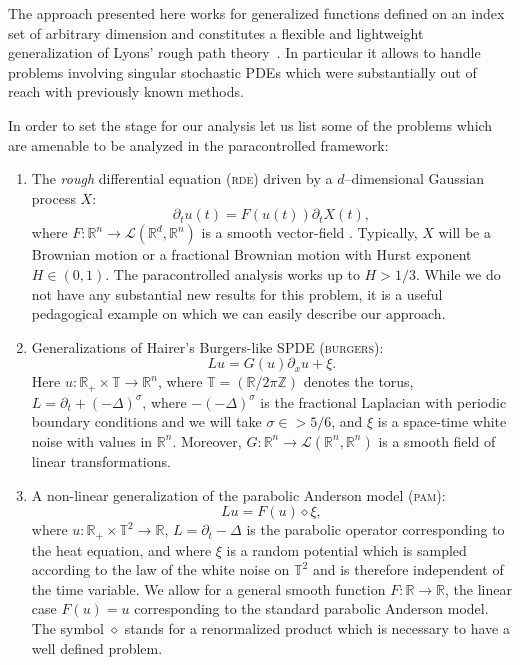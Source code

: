 \documentclass[11pt,a4paper]{article}
\theoremstyle{remark}
\newcommand{\R}{\mathbb{R}}
\newcommand{\Z}{\mathbb{Z}}
\newcommand{\Lcal}{\mathcal{L}}
\begin{document}
The approach presented here works for generalized functions defined on an index set of arbitrary dimension and constitutes a flexible and lightweight generalization of Lyons' rough path theory~\cite{Lyons1998}. In particular it allows to handle problems involving singular stochastic PDEs which were substantially out of reach with previously known methods.

In order to set the stage for our analysis let us list some of the problems which are amenable to be analyzed in the paracontrolled framework:
\begin{enumerate}%
  \item The \emph{rough} differential equation (\textsc{rde}) driven by a $d$--dimensional Gaussian process $X$: 
  \[
     \partial_t u(t) = F(u(t)) \partial_t X(t),%
  \]
  where $F\colon\R^n \rightarrow \Lcal(\R^d, \R^n)$ is a smooth vector-field . Typically, $X$ will be a Brownian motion or a fractional Brownian motion with Hurst exponent $H\in(0,1)$. The paracontrolled analysis works up to $H>1/3$.  While we do not have any substantial new results for this problem, it is a useful pedagogical example on which we can easily describe our approach.
  
  \item Generalizations of Hairer's Burgers-like SPDE (\textsc{burgers}):
  \[
     L u = G(u) \partial_x u + \xi.
  \]
  Here $u\colon \R_+ \times \mathbb{T} \rightarrow \R^n$, where $\mathbb{T} = (\R/2\pi \Z)$ denotes the torus, $L = \partial_t + (-\Delta)^{\sigma}$, where $-(-\Delta)^\sigma$ is the fractional Laplacian with periodic boundary conditions and we will take $\sigma \in > 5/6$, and $\xi$ is a space-time white noise with values in $\R^n$. Moreover, $G\colon \R^n \rightarrow \Lcal (\R^n, \R^n)$ is a smooth field of linear transformations.
  
  \item A non-linear generalization of the parabolic Anderson model (\textsc{pam}):
  \[
     L u = F(u) \diamond \xi,
  \]
  where $u \colon \R_+ \times \mathbb{T}^2 \rightarrow \R$, $L = \partial_t - \Delta$ is the parabolic operator corresponding to the heat equation, and where $\xi$ is a random potential which is sampled according to the law of the white noise on  $\mathbb{T}^2$ and is therefore independent of the time variable. We allow for a general smooth function $F\colon \R \rightarrow \R$, the linear case $F(u)=u$ corresponding to the standard parabolic Anderson model. The symbol $\diamond$ stands for a renormalized product which is necessary to have a well defined problem. 
  

\end{enumerate}
\end{document}
